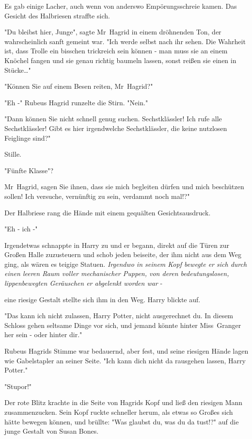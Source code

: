 {Es gab einige Lacher, auch wenn von anderswo Empörungsschreie kamen. Das Gesicht des Halbriesen straffte sich.

"Du bleibst hier, Junge", sagte Mr~Hagrid in einem dröhnenden Ton, der wahrscheinlich sanft gemeint war. "Ich werde selbst nach ihr sehen. Die Wahrheit ist, dass Trolle ein bisschen trickreich sein können - man muss sie an einem Knöchel fangen und sie genau richtig baumeln lassen, sonst reißen sie einen in Stücke…"

"Können Sie auf einem Besen reiten, Mr~Hagrid?"

"Eh -" Rubeus Hagrid runzelte die Stirn. "Nein."

"Dann können Sie nicht schnell genug suchen. Sechstklässler! Ich rufe alle Sechstklässler! Gibt es hier irgendwelche Sechstklässler, die keine nutzlosen Feiglinge sind?"

Stille.

"Fünfte Klasse"?

Mr~Hagrid, sagen Sie ihnen, dass sie mich begleiten dürfen und mich beschützen sollen! Ich versuche, vernünftig zu sein, verdammt noch mal!?"

Der Halbriese rang die Hände mit einem gequälten Gesichtsausdruck.

"Eh - ich -"

Irgendetwas schnappte in Harry zu und er begann, direkt auf die Türen zur Großen Halle zuzusteuern und schob jeden beiseite, der ihm nicht aus dem Weg ging, als wären es teigige Statuen. \emph{Irgendwo in seinem Kopf bewegte er sich durch einen leeren Raum voller mechanischer Puppen, von deren bedeutungslosen, lippenbewegten Geräuschen er abgelenkt worden war} -

eine riesige Gestalt stellte sich ihm in den Weg. Harry blickte auf.

"Das kann ich nicht zulassen, Harry Potter, nicht ausgerechnet du. In diesem Schloss gehen seltsame Dinge vor sich, und jemand könnte hinter Miss~Granger her sein - oder hinter dir."

Rubeus Hagrids Stimme war bedauernd, aber fest, und seine riesigen Hände lagen wie Gabelstapler an seiner Seite. "Ich kann dich nicht da rausgehen lassen, Harry Potter."

"Stupor!"

Der rote Blitz krachte in die Seite von Hagrids Kopf und ließ den riesigen Mann zusammenzucken. Sein Kopf ruckte schneller herum, als etwas so Großes sich hätte bewegen können, und brüllte: "Was glaubst du, was du da tust!?" auf die junge Gestalt von Susan Bones.

}
